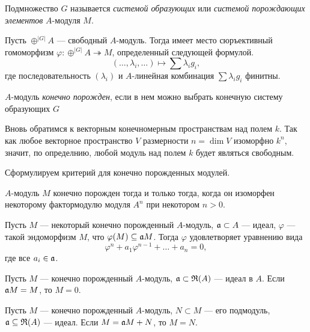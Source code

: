     Подмножество $G$ называется \textit{системой образующих} или \textit{системой порождающих элементов} $A$-модуля $M$.

    Пусть $\oplus^{|G|}A$ --- свободный $A$-модуль. Тогда имеет место сюръективный гомоморфизм $\varphi : \oplus^{|G|}A \twoheadrightarrow M$, определенный следующей формулой.
    $$
        (\dots, \lambda_i, \dots) \mapsto \sum \lambda_ig_i,
    $$
    где последовательность $(\lambda_i)$ и $A$-линейная комбинация $\sum \lambda_ig_i$ финитны.

    \begin{Def}
        $A$-модуль \textit{конечно порожден}, если в нем можно выбрать конечную систему образующих $G$
    \end{Def}

    Вновь обратимся к векторным конечномерным пространствам над полем $k$. 
    Так как любое векторное пространство $V$ размерности $n = \dim V$ изоморфно $k^n$, значит, по определнию, любой модуль над полем $k$ будет являться свободным.

    Сформулируем критерий для конечно порожденных модулей.

    \begin{Theorem}{\cite{A-M}}
        $A$-модуль $M$ конечно порожден тогда и только тогда, когда он изоморфен некоторому фактормодулю модуля $A^n$ при некотором $n > 0$.
    \end{Theorem}

    \begin{Theorem}{\cite{A-M}}
        Пусть $M$ --- некоторый конечно порожденный $A$-модуль, $\mathfrak{a} \subset A$ --- идеал, $\varphi$ --- такой эндоморфизм $M$, что $\varphi(M) \subseteq \mathfrak{a}M$.
        Тогда $\varphi$ удовлетворяет уравнению вида
        $$
            \varphi^n + a_1\varphi^{n - 1} + \dots + a_n = 0,
        $$
        где все $a_i \in \mathfrak{a}$.
    \end{Theorem}

    \begin{Theorem}{\cite{A-M}}
        Пусть $M$ --- конечно порожденный $A$-модуль, \linebreak $\mathfrak{a} \subset \mathfrak{R}(A)$ --- идеал в $A$. 
        Если $\mathfrak{a}M = M$, то $M = 0$.
    \end{Theorem}  

    \begin{Corollary}{\cite{A-M}}
        Пусть $M$ --- конечно порожденный $A$-модуль, $N \subset M$ --- его подмодуль, $\mathfrak{a} \subseteq \mathfrak{R}(A)$ --- идеал.
        Если $M = \mathfrak{a}M + N$, то $M = N$.
    \end{Corollary}

